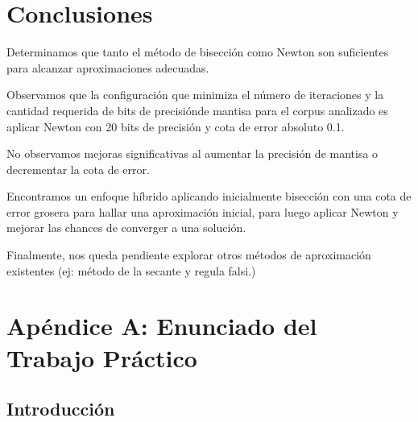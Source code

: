 \documentclass[a4paper,10pt,twoside]{article}
\begin{document}


\section{Conclusiones}

Determinamos que tanto el método de bisección como Newton son suficientes para
alcanzar aproximaciones adecuadas.

Observamos que la configuración que minimiza el número de iteraciones y la
cantidad requerida de bits de precisiónde mantisa para el corpus analizado es
aplicar Newton con 20 bits de precisión y cota de error absoluto 0.1.

No observamos mejoras significativas al aumentar la precisión de mantisa o
decrementar la cota de error.

Encontramos un enfoque híbrido aplicando inicialmente bisección con una cota de
error grosera para hallar una aproximación inicial, para luego aplicar Newton y
mejorar las chances de converger a una solución.

Finalmente, nos queda pendiente explorar otros  métodos de aproximación existentes
(ej: método de la secante y regula falsi.)




\section{Apéndice A: Enunciado del Trabajo Práctico}

\newcommand{\real}{\mathbb{R}}
\newcommand{\nat}{\mathbb{N}}
\newcommand{\eme}{\mathcal{M}}
\newcommand{\emeh}{\widehat{\mathcal{M}}}
\newcommand{\ere}{\mathcal{R}}

\subsection{Introducci\'on}
\end{document}
